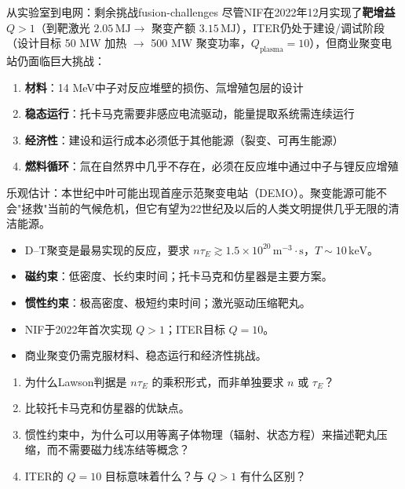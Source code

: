 \documentclass[12pt,a4paper,openany,oneside]{book}
\begin{document}
\begin{insight}{从实验室到电网：剩余挑战}{fusion-challenges}
尽管NIF在2022年12月实现了\textbf{靶增益} $Q>1$（到靶激光 $2.05\,\mathrm{MJ}\to$ 聚变产额 $3.15\,\mathrm{MJ}$），ITER仍处于建设/调试阶段（设计目标 50 MW 加热 $\to$ 500 MW 聚变功率，$Q_{\text{plasma}}=10$），但商业聚变电站仍面临巨大挑战：
\begin{enumerate}
\item \textbf{材料}：14 MeV中子对反应堆壁的损伤、氚增殖包层的设计
\item \textbf{稳态运行}：托卡马克需要非感应电流驱动，能量提取系统需连续运行
\item \textbf{经济性}：建设和运行成本必须低于其他能源（裂变、可再生能源）
\item \textbf{燃料循环}：氚在自然界中几乎不存在，必须在反应堆中通过中子与锂反应增殖
\end{enumerate}

乐观估计：本世纪中叶可能出现首座示范聚变电站（DEMO）。聚变能源可能不会"拯救"当前的气候危机，但它有望为22世纪及以后的人类文明提供几乎无限的清洁能源。
\end{insight}

\begin{chapterreview}
\begin{itemize}
\item D--T聚变是最易实现的反应，要求 $n\tau_E \gtrsim 1.5\times 10^{20}\,\mathrm{m}^{-3}\cdot\mathrm{s}$，$T\sim 10\,\mathrm{keV}$。
\item \textbf{磁约束}：低密度、长约束时间；托卡马克和仿星器是主要方案。
\item \textbf{惯性约束}：极高密度、极短约束时间；激光驱动压缩靶丸。
\item NIF于2022年首次实现 $Q>1$；ITER目标 $Q=10$。
\item 商业聚变仍需克服材料、稳态运行和经济性挑战。
\end{itemize}
\end{chapterreview}

\begin{miniquiz}
\begin{enumerate}
\item 为什么Lawson判据是 $n\tau_E$ 的乘积形式，而非单独要求 $n$ 或 $\tau_E$？
\item 比较托卡马克和仿星器的优缺点。
\item 惯性约束中，为什么可以用等离子体物理（辐射、状态方程）来描述靶丸压缩，而不需要磁力线冻结等概念？
\item ITER的 $Q=10$ 目标意味着什么？与 $Q>1$ 有什么区别？
\end{enumerate}
\end{miniquiz}
\end{document}
